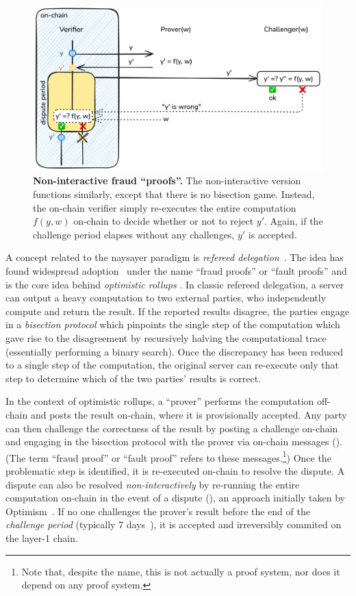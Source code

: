  \begin{figure}[tbh]
    \includegraphics[width=\textwidth]{naysayer/figs/fraud-NI.png}
    \caption{\textbf{Non-interactive fraud ``proofs''.} The non-interactive version functions similarly, except that there is no bisection game. Instead, the on-chain verifier simply re-executes the entire computation $f(y, w)$ on-chain to decide whether or not to reject $y'$. Again, if the challenge period elapses without any challenges, $y'$ is accepted.}
    \label{fig:fraud-NI}
 \end{figure}

A concept related to the naysayer paradigm is \emph{refereed delegation}~\cite{STOC:FeiKil97}. The idea has found widespread adoption~\cite{ARXIV:TeuRei19,USENIX:KGCWF18} under the name ``fraud proofs'' or ``fault proofs'' and is the core idea behind \emph{optimistic rollups} \cite{ethereum_optimistic,arbitrum_nitro,optimism_rollup}. In classic refereed delegation, a server can output a heavy computation to two external parties, who independently compute and return the result. If the reported results disagree, the parties engage in a \emph{bisection protocol} which pinpoints the single step of the computation which gave rise to the disagreement by recursively halving the computational trace (essentially performing a binary search). Once the discrepancy has been reduced to a single step of the computation, the original server can re-execute only that step to determine which of the two parties' results is correct. 

In the context of optimistic rollups, a ``prover'' performs the computation off-chain and posts the result on-chain, where it is provisionally accepted. Any party can then challenge the correctness of the result by posting a challenge on-chain and engaging in the bisection protocol with the prover via on-chain messages (). (The term ``fraud proof'' or ``fault proof'' refers to these messages.\footnote{Note that, despite the name, this is not actually a proof system, nor does it depend on any proof system.}) Once the problematic step is identified, it is re-executed on-chain to resolve the dispute. A dispute can also be resolved \emph{non-interactively} by re-running the entire computation on-chain in the event of a dispute (), an approach initially taken by Optimism~\cite{optimism_v1,buckland_fraudproofs}.
If no one challenges the prover's result before the end of the \emph{challenge period} (typically 7 days~\cite{why7days}), it is accepted and irreversibly commited on the layer-1 chain.

